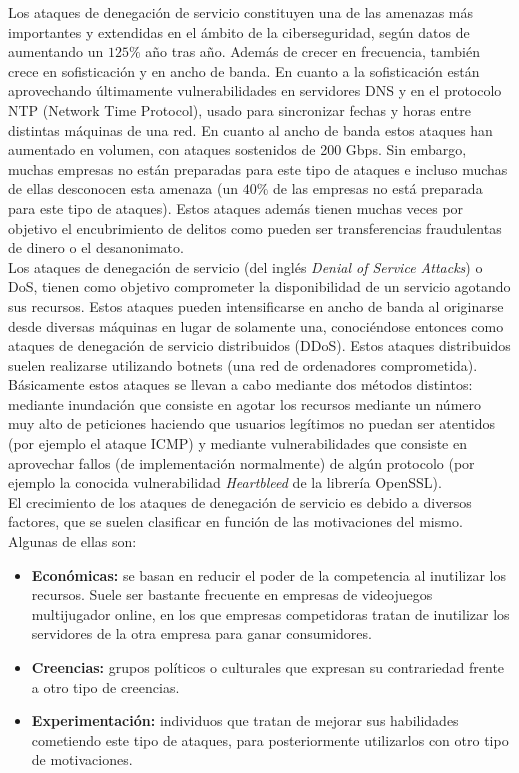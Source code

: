 Los ataques de denegación de servicio constituyen una de las amenazas más importantes y extendidas en el ámbito de la ciberseguridad, según datos de \cite{akamai:2016} aumentando un $125\%$ a\~no tras a\~no. Además de crecer en frecuencia, también crece en sofisticación y en ancho de banda. En cuanto a la sofisticación están aprovechando últimamente vulnerabilidades en servidores DNS y en el protocolo NTP (Network Time Protocol), usado para sincronizar fechas y horas entre distintas máquinas de una red. En cuanto al ancho de banda estos ataques han aumentado en volumen, con ataques sostenidos de 200 Gbps\cite{sans}. Sin embargo, muchas empresas no están preparadas para este tipo de ataques e incluso muchas de ellas desconocen esta amenaza (un $40\%$ de las empresas no está preparada para este tipo de ataques\cite{sans}). Estos ataques además tienen muchas veces por objetivo el encubrimiento de delitos como pueden ser transferencias fraudulentas de dinero o el desanonimato\cite{sniper:2014}. \\

Los ataques de denegación de servicio (del inglés \textit{Denial of Service Attacks}) o DoS, tienen como objetivo comprometer la disponibilidad de un servicio agotando sus recursos. Estos ataques pueden intensificarse en ancho de banda al originarse desde diversas máquinas en lugar de solamente una, conociéndose entonces como ataques de denegación de servicio distribuidos (DDoS). Estos ataques distribuidos suelen realizarse utilizando botnets (una red de ordenadores comprometida). Básicamente estos ataques se llevan a cabo mediante dos métodos distintos: mediante inundación que consiste en agotar los recursos mediante un número muy alto de peticiones haciendo que usuarios legítimos no puedan ser atentidos (por ejemplo el ataque ICMP) y mediante vulnerabilidades que consiste en aprovechar fallos (de implementación normalmente) de algún protocolo (por ejemplo la conocida vulnerabilidad \textit{Heartbleed} de la librería OpenSSL)\cite{peng:2007}. \\

El crecimiento de los ataques de denegación de servicio es debido a diversos factores, que se suelen clasificar en función de las motivaciones del mismo. Algunas de ellas son\cite{peng:2007}:
\begin{itemize}
\item \textbf{Económicas:} se basan en reducir el poder de la competencia al inutilizar los recursos. Suele ser bastante frecuente en empresas de videojuegos multijugador online, en los que empresas competidoras tratan de inutilizar los servidores de la otra empresa para ganar consumidores. 
\item \textbf{Creencias:} grupos políticos o culturales que expresan su contrariedad frente a otro tipo de creencias.
\item \textbf{Experimentación:} individuos que tratan de mejorar sus habilidades cometiendo este tipo de ataques, para posteriormente utilizarlos con otro tipo de motivaciones.
\end{itemize} 


